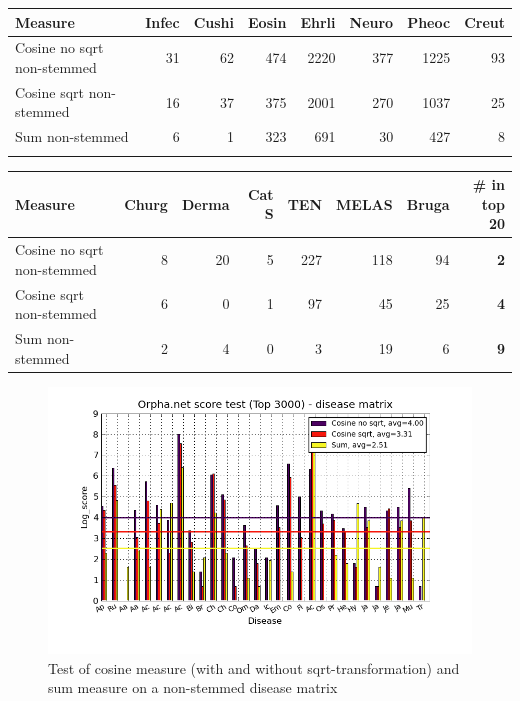 \begin{table}[H]
  \begin{tiny}
    \begin{tabular}{|l|r|r|r|r|r|r|r|}
      \hline
      Measure &Infec&Cushi&Eosin&Ehrli&Neuro&Pheoc&Creut \\
      \hline
      Cosine no sqrt non-stemmed &31&62&474&2220&377&1225&93 \\
      \hline
      Cosine sqrt non-stemmed &16&37&375&2001&270&1037&25 \\
      \hline
      Sum non-stemmed &6&1&323&691&30&427&8  \\
      \hline
      \multicolumn{8}{c}{} \\
    \end{tabular}
    \begin{tabular}{|l|r|r|r|r|r|r|r|}
      \hline
      Measure &Churg&Derma&Cat S&TEN&MELAS&Bruga& \scriptsize{\textbf{\# in top 20}} \\
      \hline
      Cosine no sqrt non-stemmed &8&20&5&227&118&94 &\scriptsize{\textbf{2}} \\
      \hline
      Cosine sqrt non-stemmed &6&0&1&97&45&25 &  \scriptsize{\textbf{4}}\\
      \hline
      Sum non-stemmed &2&4&0&3&19&6 & \scriptsize{\textbf{9}} \\
      \hline
    \end{tabular}
  \end{tiny}
\end{table}

\begin{figure}[H]
  \caption{Test of cosine measure (with and without sqrt-transformation) and sum measure on a non-stemmed disease matrix}
  \begin{center}
    \includegraphics[width=1.2\textwidth]{barcharts/diseaseMatrix_orphan_hist_NOTnorm_3000_ns_cos_sqrt_cos_sum_nn.png}
  \end{center}
  \label{diseaseMatrix_orphan_hist_NOTnorm_3000_ns_cos_sqrt_cos_sum_nn}
\end{figure}

